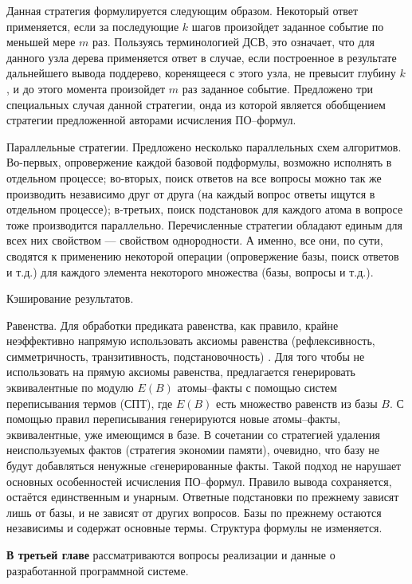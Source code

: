 \documentclass[a4paper]{report}
\begin{document}
Данная стратегия формулируется следующим образом. Некоторый ответ применяется, если за последующие $k$ шагов произойдет заданное событие по меньшей мере $m$ раз. Пользуясь терминологией ДСВ, это означает, что для данного узла дерева применяется ответ в случае, если построенное в результате дальнейшего вывода поддерево, коренящееся с этого узла, не превысит глубину $k$, и до этого момента произойдет $m$ раз заданное событие. Предложено три специальных случая данной стратегии, онда из которой является обобщением стратегии предложенной авторами исчисления ПО--формул.

Параллельные стратегии. Предложено несколько параллельных схем алгоритмов. Во-первых, опровержение каждой базовой подформулы, возможно исполнять в отдельном процессе; во-вторых, поиск ответов на все вопросы можно так же производить независимо друг от друга (на каждый вопрос ответы ищутся в отдельном процессе); в-третьих, поиск подстановок для каждого атома в вопросе тоже производится параллельно. Перечисленные стратегии обладают единым для всех них свойством --- свойством однородности. А именно, все они, по сути, сводятся к применению некоторой операции (опровержение базы, поиск ответов и т.д.) для каждого элемента некоторого множества (базы, вопросы и т.д.).

Кэширование результатов.

Равенства. Для обработки предиката равенства, как правило, крайне неэффективно напрямую использовать аксиомы равенства (рефлексивность, симметричность, транзитивность, подстановочность) . Для того чтобы не использовать на прямую аксиомы равенства, предлагается генерировать эквивалентные по модулю $E(B)$ атомы--факты с помощью систем переписывания термов (СПТ), где $E(B)$ есть множество равенств из базы $B$. С помощью правил переписывания генерируются новые атомы--факты, эквивалентные, уже имеющимся в базе. В сочетании со стратегией удаления неиспользуемых фактов (стратегия экономии памяти), очевидно, что базу не будут добавляться ненужные cгенерированные факты. Такой подход не нарушает основных особенностей исчисления ПО--формул. Правило вывода сохраняется, остаётся единственным и унарным. Ответные подстановки по прежнему зависят лишь от базы, и не зависят от других вопросов. Базы по прежнему остаются независимы и содержат основные термы. Структура формулы не изменяется.




\textbf{В третьей главе} рассматриваются вопросы реализации и данные о разработанной программной системе.
\end{document}
